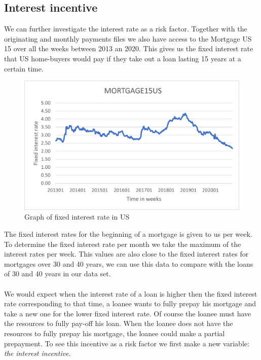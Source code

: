 \subsection{Interest incentive}
    We can further investigate the interest rate as a risk factor. 
    Together with the originating and monthly payments files we 
    also have access to the Mortgage US 15 over all the weeks 
    between 2013 an 2020. This gives us the fixed interest rate 
    that US home-buyers would pay if they take out a loan lasting 
    15 years at a certain time.
    \begin{figure}[H]
        \centering
        \includegraphics[scale=0.7]{Figures/mortgage15US.png}
        \caption{
            Graph of fixed interest rate in US
            }
        \label{mortgage15us}
    \end{figure}
    The fixed interest rates for the beginning of a mortgage is 
    given to us per week. To determine the fixed interest rate 
    per month we take the maximum of the interest rates per week. 
    This values are also close to the fixed interest rates for 
    mortgages over 30 and 40 years, we can use this data to compare 
    with the loans of 30 and 40 years in our data set.
    \\\\
    We would expect when the interest rate of a loan is higher then 
    the fixed interest rate corresponding to that time, a loanee wants 
    to fully prepay his mortgage and take a new one for the lower 
    fixed interest rate. Of course the loanee must have the resources 
    to fully pay-off his loan. When the loanee does not have the 
    resources to fully prepay his mortgage, the loanee could make 
    a partial prepayment. To see this incentive as a risk factor we 
    first make a new variable: \textit{the interest incentive}. 
